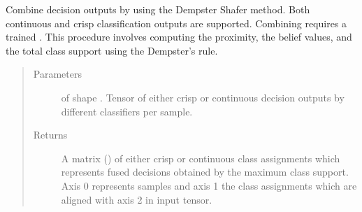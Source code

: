 \documentclass[letterpaper,10pt,english]{sphinxmanual}
\begin{document}
\begin{fulllineitems}
\begin{fulllineitems}
\label{\detokenize{pusion.core.dempster_shafer_combiner:pusion.core.dempster_shafer_combiner.DempsterShaferCombiner.combine}}
\sphinxAtStartPar
Combine decision outputs by using the Dempster Shafer method.
Both continuous and crisp classification outputs are supported. Combining requires a trained
{\hyperref[\detokenize{pusion.core.dempster_shafer_combiner:pusion.core.dempster_shafer_combiner.DempsterShaferCombiner}]{}}.
This procedure involves computing the proximity, the belief values, and the total class support using the
Dempster’s rule.
\begin{quote}\begin{description}
\item[{Parameters}] \leavevmode
\sphinxAtStartPar
{} \textendash{}  of shape .
Tensor of either crisp or continuous decision outputs by different classifiers per sample.

\item[{Returns}] \leavevmode
\sphinxAtStartPar
A matrix () of either crisp or continuous class assignments which represents fused
decisions obtained by the maximum class support. Axis 0 represents samples and axis 1 the class
assignments which are aligned with axis 2 in  input tensor.

\end{description}\end{quote}

\end{fulllineitems}


\end{fulllineitems}

\end{document}
